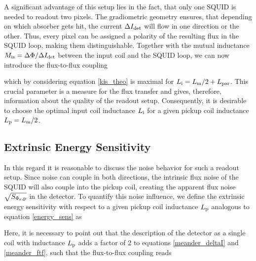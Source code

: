 
A significant advantage of this setup lies in the fact, that only one SQUID is needed to readout two pixels. The gradiometric geometry ensures, that depending on which absorber gets hit, the current $\Delta I_{\rm det}$ will flow in one direction or the other. Thus, every pixel can be assigned a polarity of the resulting flux in the SQUID loop, making them distinguishable. Together with the mutual inductance $M_{\rm is}=\Delta\Phi/\Delta I_{\rm det}$ between the input coil and the SQUID loop, we can now introduce the flux-to-flux coupling 


which by considering equation \ref{kis_theo} is maximal for $L_{\rm i}=L_{\rm m}/2+L_{\rm par}$. This crucial parameter is a measure for the flux transfer and gives, therefore, information about the quality of the readout setup. Consequently, it is desirable to choose the optimal input coil inductance $L_{\rm i}$ for a given pickup coil inductance $L_{\rm p}=L_{\rm m}/2$.

\subsection{Extrinsic Energy Sensitivity}\label{subsec_extr_sens_theo}

In this regard it is reasonable to discuss the noise behavior for such a readout setup. Since noise can couple in both directions, the intrinsic flux noise of the SQUID will also couple into the pickup coil, creating the apparent flux noise $\sqrt{S_{\rm\Phi_{\rm s},p}}$ in the detector. To quantify this noise influence, we define the extrinsic energy sensitivity with respect to a given pickup coil inductance $L_{\rm p}$ analogous to equation \ref{energy_sens} as \cite{Knuutila1988}


Here, it is necessary to point out that the description of the detector as a single coil with inductance $L_{\rm p}$ adds a factor of 2 to equations \ref{meander_deltaI} and \ref{meander_ftf}, such that the flux-to-flux coupling reads


